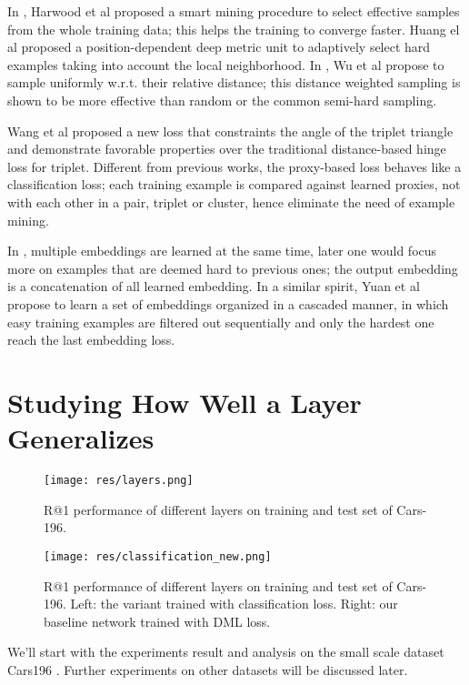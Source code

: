\documentclass[10pt,twocolumn,letterpaper]{article}
\begin{document}
In \cite{kumar2017smart}, Harwood et al proposed a smart mining procedure to select effective samples from the whole training data; this helps the training to converge faster. 
Huang el al \cite{huang2016local} proposed a position-dependent deep metric unit to adaptively select hard examples taking into account the local neighborhood.
In \cite{wu2017sampling}, Wu et al propose to sample uniformly w.r.t. 
their relative distance; this distance weighted sampling is shown to be more effective than random or the common semi-hard sampling.

Wang et al \cite{wang2017deep} proposed a new loss that constraints the angle of the triplet triangle and demonstrate favorable properties over the traditional distance-based hinge loss for triplet. Different from previous works, the proxy-based loss \cite{movshovitz2017no} behaves like a classification loss; each training example is compared against learned proxies, not with each other in a pair, triplet or cluster, hence eliminate the need of example mining.

In \cite{opitz2017bier}, multiple embeddings are learned at the same time, later one would focus more on examples that are deemed hard to previous ones; the output embedding is a concatenation of all learned embedding.
In a similar spirit, Yuan et al \cite{yuan2016hard} propose to learn a set of embeddings organized in a cascaded manner, in which easy training examples are filtered out sequentially and only the hardest one reach the last embedding loss. 

\section{Studying How Well a Layer Generalizes}

\begin{figure*}
  \texttt{[image: res/layers.png]}
  \caption{R@1 performance of different layers on training and test set of Cars-196.}
  \label{fig:layers}
\end{figure*}

\begin{figure}
  \texttt{[image: res/classification\_new.png]}
  \caption{R@1 performance of different layers on training and test set of Cars-196. Left: the variant trained with classification loss. Right: our baseline network trained with DML loss.}
  \label{fig:classification}
\end{figure}


We'll start with the experiments result and analysis on the small scale dataset Cars196 \cite{KrauseStarkDengFei-Fei_3DRR2013}. Further experiments on other datasets will be discussed later.
\end{document}
